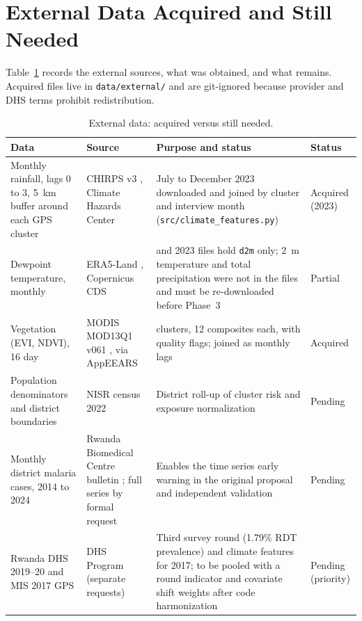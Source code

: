 \documentclass[11pt]{article}
\begin{document}
\section{External Data Acquired and Still Needed}
Table~\ref{tab:data} records the external sources, what was obtained, and what remains. Acquired files live in \texttt{data/external/} and are git-ignored because provider and DHS terms prohibit redistribution.

\begin{table}[t]
\centering\footnotesize
\renewcommand{\arraystretch}{1.1}
\begin{tabularx}{\textwidth}{>{\raggedright\arraybackslash}p{3.0cm}>{\raggedright\arraybackslash}p{4.2cm}>{\raggedright\arraybackslash}X>{\raggedright\arraybackslash}p{2.2cm}}
\toprule
Data & Source & Purpose and status & Status\\
\midrule
Monthly rainfall, lags 0 to 3, 5~km buffer around each GPS cluster & CHIRPS v3 \cite{funk2015}, Climate Hazards Center & July to December 2023 downloaded and joined by cluster and interview month (\texttt{src/climate\_features.py}) & Acquired (2023)\\
Dewpoint temperature, monthly & ERA5-Land \cite{munozsabater2021}, Copernicus CDS & 2017 and 2023 files hold \texttt{d2m} only; 2~m temperature and total precipitation were not in the files and must be re-downloaded before Phase~3 & Partial\\
Vegetation (EVI, NDVI), 16 day & MODIS MOD13Q1 v061 \cite{didan2020}, via AppEEARS & 170 clusters, 12 composites each, with quality flags; joined as monthly lags & Acquired\\
Population denominators and district boundaries & NISR census 2022 \cite{nisr2022} & District roll-up of cluster risk and exposure normalization & Pending\\
Monthly district malaria cases, 2014 to 2024 & Rwanda Biomedical Centre bulletin \cite{rbc2024}; full series by formal request & Enables the time series early warning in the original proposal and independent validation & Pending\\
Rwanda DHS 2019--20 and MIS 2017 GPS & DHS Program (separate requests) & Third survey round (1.79\% RDT prevalence) and climate features for 2017; to be pooled with a round indicator and covariate shift weights after code harmonization & Pending (priority)\\
\bottomrule
\end{tabularx}
\caption{External data: acquired versus still needed.}
\label{tab:data}
\end{table}
\end{document}
